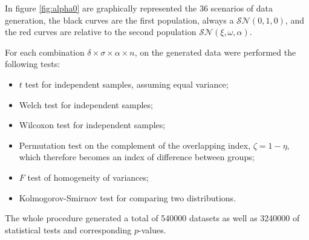 \documentclass[twocolumn]{article}\usepackage[]{graphicx}\usepackage[]{xcolor}
\begin{document}
In figure \ref{fig:alpha0} are graphically represented the 36 scenarios of data generation, the black curves are the first population, always a $\mathcal{SN}(0,1,0)$, and the red curves are relative to the second population $\mathcal{SN}(\xi,\omega,\alpha)$.

For each combination $\delta \times \sigma \times \alpha \times n $, on the generated data were performed the following tests: 
\begin{itemize}
 \item $t$ test for independent samples, assuming equal variance;
 \item Welch test for independent samples;
 \item Wilcoxon test for independent samples;
 \item Permutation test on the complement of the overlapping index, $\zeta = 1-\eta$, which therefore becomes an index of difference between groups;
 \item $F$ test of homogeneity of variances;
 \item Kolmogorov-Smirnov test for comparing two distributions.
\end{itemize}

The whole procedure generated a total of 540000 datasets as well as 3240000 of statistical tests and corresponding $p$-values.

\end{document}
